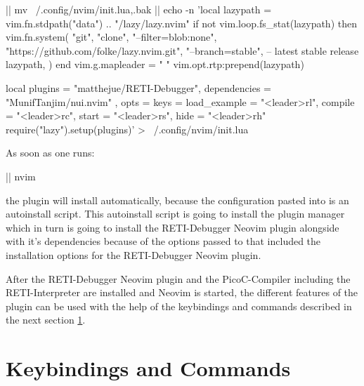\documentclass{report}
\begin{document}
\begin{terminal}
  |\prompt| mv ~/.config/nvim/init.lua{,.bak}
  |\prompt| echo -n 'local lazypath = vim.fn.stdpath("data") .. "/lazy/lazy.nvim"
  if not vim.loop.fs_stat(lazypath) then
    vim.fn.system({
      "git",
      "clone",
      "--filter=blob:none",
      "https://github.com/folke/lazy.nvim.git",
      "--branch=stable", -- latest stable release
      lazypath,
    })
  end
  vim.g.mapleader = " "
  vim.opt.rtp:prepend(lazypath)
\end{terminal}
\begin{terminal}
  local plugins = {
    {
      "matthejue/RETI-Debugger",
      dependencies = { "MunifTanjim/nui.nvim" },
      opts = {
          keys = {
            load_example = "<leader>rl",
            compile = "<leader>rc",
            start = "<leader>rs",
            hide = "<leader>rh"
          }
      }
    }
  }
  require("lazy").setup(plugins)' > ~/.config/nvim/init.lua
\end{terminal}

As soon as one runs:

\begin{terminal}
  |\prompt| nvim
\end{terminal}

the plugin will install automatically, because the configuration pasted into  is an autoinstall script. This autoinstall script is going to install the  \alert{plugin manager} which in turn is going to install the RETI-Debugger Neovim plugin alongside with it's dependencies because of the options passed to  that included the installation options for the RETI-Debugger Neovim plugin.

After the RETI-Debugger Neovim plugin and the PicoC-Compiler including the RETI-Interpreter are installed and Neovim is started, the different features of the plugin can be used with the help of the keybindings and commands described in the next section \ref{sec:keybindings and commands}.

\section{Keybindings and Commands}
\label{sec:keybindings and commands}
\end{document}
